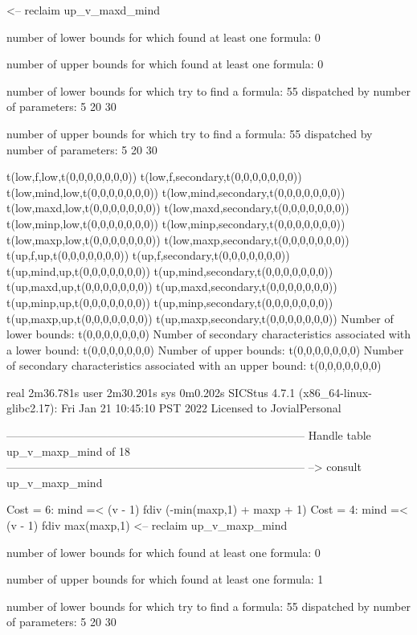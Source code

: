 <-- reclaim up_v_maxd_mind

number of lower bounds for which found at least one formula: 0

number of upper bounds for which found at least one formula: 0

number of lower bounds for which try to find a formula: 55
dispatched by number of parameters: 5  20  30

number of upper bounds for which try to find a formula: 55
dispatched by number of parameters: 5  20  30

t(low,f,low,t(0,0,0,0,0,0,0))
t(low,f,secondary,t(0,0,0,0,0,0,0))
t(low,mind,low,t(0,0,0,0,0,0,0))
t(low,mind,secondary,t(0,0,0,0,0,0,0))
t(low,maxd,low,t(0,0,0,0,0,0,0))
t(low,maxd,secondary,t(0,0,0,0,0,0,0))
t(low,minp,low,t(0,0,0,0,0,0,0))
t(low,minp,secondary,t(0,0,0,0,0,0,0))
t(low,maxp,low,t(0,0,0,0,0,0,0))
t(low,maxp,secondary,t(0,0,0,0,0,0,0))
t(up,f,up,t(0,0,0,0,0,0,0))
t(up,f,secondary,t(0,0,0,0,0,0,0))
t(up,mind,up,t(0,0,0,0,0,0,0))
t(up,mind,secondary,t(0,0,0,0,0,0,0))
t(up,maxd,up,t(0,0,0,0,0,0,0))
t(up,maxd,secondary,t(0,0,0,0,0,0,0))
t(up,minp,up,t(0,0,0,0,0,0,0))
t(up,minp,secondary,t(0,0,0,0,0,0,0))
t(up,maxp,up,t(0,0,0,0,0,0,0))
t(up,maxp,secondary,t(0,0,0,0,0,0,0))
Number of lower bounds:                                             t(0,0,0,0,0,0,0)
Number of secondary characteristics associated with a lower bound:  t(0,0,0,0,0,0,0)
Number of upper bounds:                                             t(0,0,0,0,0,0,0)
Number of secondary characteristics associated with an upper bound: t(0,0,0,0,0,0,0)

real	2m36.781s
user	2m30.201s
sys	0m0.202s
SICStus 4.7.1 (x86_64-linux-glibc2.17): Fri Jan 21 10:45:10 PST 2022
Licensed to JovialPersonal


--------------------------------------------------------------------------------
Handle table up_v_maxp_mind of 18
--------------------------------------------------------------------------------
--> consult up_v_maxp_mind

Cost =  6:  mind =< (v - 1) fdiv (-min(maxp,1) + maxp + 1)
Cost =  4:  mind =< (v - 1) fdiv max(maxp,1)
<-- reclaim up_v_maxp_mind

number of lower bounds for which found at least one formula: 0

number of upper bounds for which found at least one formula: 1

number of lower bounds for which try to find a formula: 55
dispatched by number of parameters: 5  20  30

